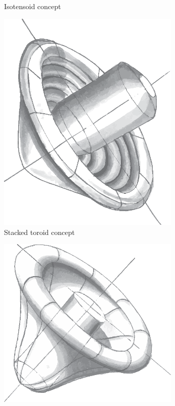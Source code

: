 \begin{figure}[h]
\begin{subfigure}[b]{0.32\textwidth}
		\caption{Isotensoid concept}
		\label{fig:isotensoid}
	\end{subfigure}
	\begin{subfigure}[b]{0.32\textwidth}
		\includegraphics[width=0.96\textwidth]{./Figure/Concepts/stacked_toroid.eps}
		\caption{Stacked toroid concept}
		\label{fig:stacked_toroid}
	\end{subfigure}
	\begin{subfigure}[b]{0.32\textwidth}
		\includegraphics[width=0.96\textwidth]{./Figure/Concepts/tension_cone.eps}

\end{subfigure}
\end{figure}
